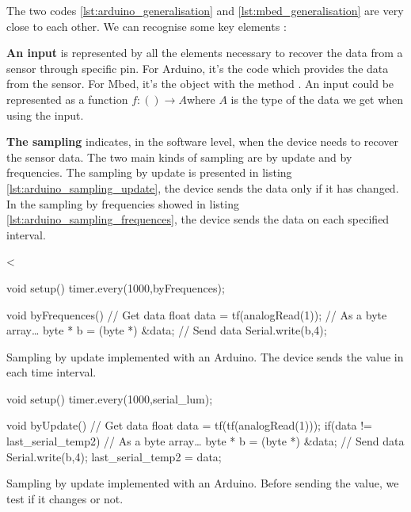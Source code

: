 The two codes \ref{lst:arduino_generalisation} and \ref{lst:mbed_generalisation}
are very close to each other. We can recognise some key elements :

\textbf{An input} is represented by all the elements necessary to recover the
data from a sensor through specific pin. For Arduino, it's the code
 which provides the data from the sensor. For
Mbed, it's the object  with the method .
An input could be represented as a function $f : () \rightarrow A$where $A$ is
the type of the data we get when using the input.

\textbf{The sampling} indicates, in the software level, when the device needs
to recover the sensor data. The two main kinds of sampling are by
update and by frequencies. The sampling by update is presented in
listing \ref{lst:arduino_sampling_update}, the device sends the data only if it has
changed. In the sampling by frequencies showed in listing
\ref{lst:arduino_sampling_frequences}, the device sends the data on each
specified interval.

\begin{listing}[H]<
  \centering
\begin{scalacode}
void setup(){
  timer.every(1000,byFrequences);
}

void byFrequences(){
  // Get data
  float data = tf(analogRead(1));
  // As a byte array…
  byte * b = (byte *) &data;
  // Send data
  Serial.write(b,4);
}
\end{scalacode}
  \caption[Sampling by frequencies implemented with an Arduino]{Sampling by update
    implemented with an Arduino. The device sends the value in each time interval.}
  \label{lst:arduino_sampling_update}
\end{listing}

\begin{listing}[H]
  \centering
\begin{scalacode}
void setup(){
  timer.every(1000,serial_lum);
}

void byUpdate(){
  // Get data
  float data = tf(tf(analogRead(1)));
  if(data != last_serial_temp2) {
    // As a byte array…
    byte * b = (byte *) &data;
    // Send data
    Serial.write(b,4);
  }
  last_serial_temp2 = data;
}
\end{scalacode}
  \caption[Sampling by update implemented with an Arduino]{Sampling by update
    implemented with an Arduino. Before sending the value, we test if it
    changes or not.}
  \label{lst:arduino_sampling_frequences}
\end{listing}

